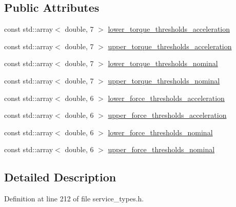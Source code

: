\subsection*{Public Attributes}
\begin{DoxyCompactItemize}
\item 
const std\+::array$<$ double, 7 $>$ \hyperlink{structresearch__interface_1_1robot_1_1SetCollisionBehavior_1_1Request_ae383766dd7327d5210f4af671c450fe0}{lower\+\_\+torque\+\_\+thresholds\+\_\+acceleration}
\item 
const std\+::array$<$ double, 7 $>$ \hyperlink{structresearch__interface_1_1robot_1_1SetCollisionBehavior_1_1Request_a2fbc8776e9e379b3c4a4ca385068234e}{upper\+\_\+torque\+\_\+thresholds\+\_\+acceleration}
\item 
const std\+::array$<$ double, 7 $>$ \hyperlink{structresearch__interface_1_1robot_1_1SetCollisionBehavior_1_1Request_acd3dd7a944935907cdc3ac5f98ca6a80}{lower\+\_\+torque\+\_\+thresholds\+\_\+nominal}
\item 
const std\+::array$<$ double, 7 $>$ \hyperlink{structresearch__interface_1_1robot_1_1SetCollisionBehavior_1_1Request_a4970067781b76b8ff8dfe452a4aaf1d2}{upper\+\_\+torque\+\_\+thresholds\+\_\+nominal}
\item 
const std\+::array$<$ double, 6 $>$ \hyperlink{structresearch__interface_1_1robot_1_1SetCollisionBehavior_1_1Request_a246f16d0a5efa11fdb3cd763f35c9410}{lower\+\_\+force\+\_\+thresholds\+\_\+acceleration}
\item 
const std\+::array$<$ double, 6 $>$ \hyperlink{structresearch__interface_1_1robot_1_1SetCollisionBehavior_1_1Request_ab42eca723dcdac40df722639b7bf4571}{upper\+\_\+force\+\_\+thresholds\+\_\+acceleration}
\item 
const std\+::array$<$ double, 6 $>$ \hyperlink{structresearch__interface_1_1robot_1_1SetCollisionBehavior_1_1Request_a43e31ce36f7042515ac6a6716618d98b}{lower\+\_\+force\+\_\+thresholds\+\_\+nominal}
\item 
const std\+::array$<$ double, 6 $>$ \hyperlink{structresearch__interface_1_1robot_1_1SetCollisionBehavior_1_1Request_ac19e6080eba637bc7d774ba0cccb3f93}{upper\+\_\+force\+\_\+thresholds\+\_\+nominal}
\end{DoxyCompactItemize}


\subsection{Detailed Description}


Definition at line 212 of file service\+\_\+types.\+h.



